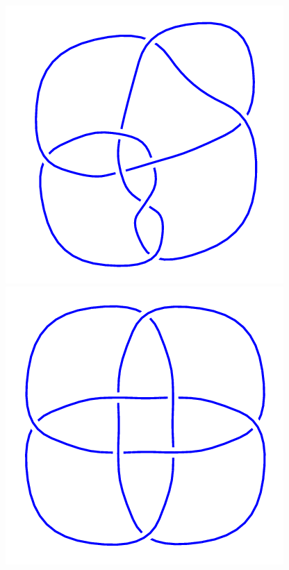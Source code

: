 \begin{figure}[H]
	\begin{minipage}[b]{.18\linewidth}
		\centering
		\includegraphics[width=\linewidth]{../data/8_17.png}
	\end{minipage}
	\begin{minipage}[b]{.18\linewidth}
		\centering
		\includegraphics[width=\linewidth]{../data/8_18.png}

\end{minipage}
\end{figure}
